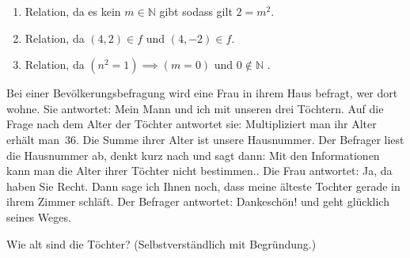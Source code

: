 \begin{lsg}\hfill
    \begin{enumerate}[label=$\mathrm{(\roman*)}$]
        \item Relation, da es kein $m \in \mathbb{N}$ gibt sodass gilt $2 = m^2$.
        \item Relation, da $(4,2)\in f$ und $(4,-2)\in f$.
        \item Relation, da $(n^2 = 1) \implies (m = 0)$ und $0 \notin \mathbb{N}$ .
    \end{enumerate}
\end{lsg}

\bigskip

\begin{aufg}[6 Punkte]
Bei einer Bev\"olkerungsbefragung wird eine Frau in ihrem Haus befragt, wer dort wohne. Sie antwortet: \glqq Mein Mann und ich mit unseren drei T\"ochtern.\grqq{} Auf die Frage nach dem Alter der T\"ochter antwortet sie: \glqq Multipliziert man ihr Alter erh\"alt man~$36$. Die Summe ihrer Alter ist unsere Hausnummer.\grqq{} Der Befrager liest die Hausnummer ab, denkt kurz nach und sagt dann: \glqq Mit den Informationen kann man die Alter ihrer T\"ochter nicht bestimmen.\grqq{}. Die Frau antwortet: \glqq Ja, da haben Sie Recht. Dann sage ich Ihnen noch, dass meine \"alteste Tochter gerade in ihrem Zimmer schl\"aft.\grqq{} Der Befrager antwortet: \glqq Dankesch\"on!\grqq{} und geht gl\"ucklich seines Weges. 

Wie alt sind die T\"ochter? (Selbstverst\"andlich mit Begr\"undung.)
\end{aufg}

\bigskip

